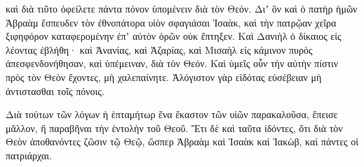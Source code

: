 {καὶ διὰ τιῦτο ὀφείλετε πάντα πόνον ὑπομένειν διὰ τὸν Θεόν.
Διʼ ὃν καὶ ὁ πατὴρ ἡμῶν Ἁβραὰμ ἔσπευδεν τὸν ἐθνοπάτορα υἱὸν σφαγιάσαι Ἰσαὰκ, καὶ τὴν πατρῷαν χεῖρα ξιφηφόρον καταφερομένην ἐπʼ αὐτὸν ὁρῶν οὐκ ἔπτηξεν.
Καὶ Δανιὴλ ὁ δίκαιος εἰς λέοντας ἐβλήθη· καὶ Ἀνανίας, καὶ Ἀζαρίας, καὶ Μισαὴλ εἰς κάμινον πυρὸς ἀπεσφενδονήθησαν, καὶ ὑπέμειναν, διὰ τὸν Θεόν.
Καὶ ὑμεῖς οὖν τὴν αὐτὴν πίστιν πρὸς τὸν Θεὸν ἔχοντες, μὴ χαλεπαίνητε.
Ἀλόγιστον γὰρ εἰδότας εὐσέβειαν μὴ ἀντιστασθαι τοῖς πόνοις.
\par }{\PP {}Διὰ τούτων τῶν λόγων ἡ ἑπταμήτωρ ἕνα ἕκαστον τῶν υἱῶν παρακαλοῦσα, ἔπεισε μᾶλλον, ἢ παραβῆναι τὴν ἐντολὴν τοῦ Θεοῦ.
Ἔτι δὲ καὶ ταῦτα ἰδόντες, ὅτι διὰ τὸν Θεὸν ἀποθανόντες ζῶσιν τῷ Θεῷ, ὥσπερ Ἁβραὰμ καὶ Ἰσαὰκ καὶ Ἰακὼβ, καὶ πάντες οἱ πατριάρχαι.

}
